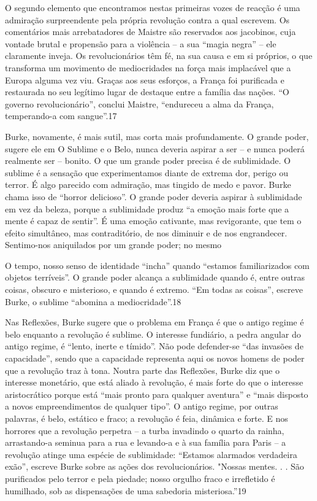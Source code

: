  \par 
O segundo elemento que encontramos nestas primeiras vozes de reacção é uma admiração surpreendente pela própria revolução contra a qual escrevem. Os comentários mais arrebatadores de Maistre são reservados aos jacobinos, cuja vontade brutal e propensão para a violência – a sua “magia negra” – ele claramente inveja. Os revolucionários têm fé, na sua causa e em si próprios, o que transforma um movimento de mediocridades na força mais implacável que a Europa alguma vez viu. Graças aos seus esforços, a França foi purificada e restaurada no seu legítimo lugar de destaque entre a família das nações. “O governo revolucionário”, conclui Maistre, “endureceu a alma da França, temperando-a com sangue”.{\color{blue}17}
 \par 
Burke, novamente, é mais sutil, mas corta mais profundamente. O grande poder, sugere ele em O Sublime e o Belo, nunca deveria aspirar a ser – e nunca poderá realmente ser – bonito. O que um grande poder precisa é de sublimidade. O sublime é a sensação que experimentamos diante de extrema dor, perigo ou terror. É algo parecido com admiração, mas tingido de medo e pavor. Burke chama isso de “horror delicioso”. O grande poder deveria aspirar à sublimidade em vez da beleza, porque a sublimidade produz “a emoção mais forte que a mente é capaz de sentir”. É uma emoção cativante, mas revigorante, que tem o efeito simultâneo, mas contraditório, de nos diminuir e de nos engrandecer. Sentimo-nos aniquilados por um grande poder; no mesmo
 \par 
O tempo, nosso senso de identidade “incha” quando “estamos familiarizados com objetos terríveis”. O grande poder alcança a sublimidade quando é, entre outras coisas, obscuro e misterioso, e quando é extremo. “Em todas as coisas”, escreve Burke, o sublime “abomina a mediocridade”.{\color{blue}18}
 \par 
Nas Reflexões, Burke sugere que o problema em França é que o antigo regime é belo enquanto a revolução é sublime. O interesse fundiário, a pedra angular do antigo regime, é “lento, inerte e tímido”. Não pode defender-se “das invasões de capacidade”, sendo que a capacidade representa aqui os novos homens de poder que a revolução traz à tona. Noutra parte das Reflexões, Burke diz que o interesse monetário, que está aliado à revolução, é mais forte do que o interesse aristocrático porque está “mais pronto para qualquer aventura” e “mais disposto a novos empreendimentos de qualquer tipo”. O antigo regime, por outras palavras, é belo, estático e fraco; a revolução é feia, dinâmica e forte. E nos horrores que a revolução perpetra – a turba invadindo o quarto da rainha, arrastando-a seminua para a rua e levando-a e à sua família para Paris – a revolução atinge uma espécie de sublimidade: “Estamos alarmados verdadeira exão”, escreve Burke sobre as ações dos revolucionários. "Nossas mentes. . . São purificados pelo terror e pela piedade; nosso orgulho fraco e irrefletido é humilhado, sob as dispensações de uma sabedoria misteriosa.”{\color{blue}19}

